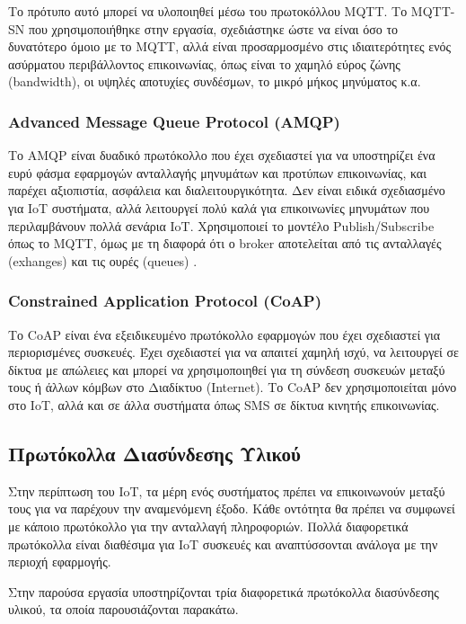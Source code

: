 Το πρότυπο αυτό μπορεί να υλοποιηθεί μέσω του πρωτοκόλλου MQTT. Το MQTT-SN που χρησιμοποιήθηκε στην εργασία, σχεδιάστηκε ώστε να είναι όσο το δυνατότερο όμοιο με το MQTT, αλλά είναι προσαρμοσμένο στις ιδιαιτερότητες ενός ασύρματου περιβάλλοντος επικοινωνίας, όπως είναι το χαμηλό εύρος ζώνης (bandwidth), οι υψηλές αποτυχίες συνδέσμων, το μικρό μήκος μηνύματος κ.α.

\subsubsection{Advanced Message Queue Protocol (AMQP)}
\label{subsubsec:amqp}

Το AMQP είναι δυαδικό πρωτόκολλο που έχει σχεδιαστεί για να υποστηρίζει ένα ευρύ φάσμα εφαρμογών ανταλλαγής μηνυμάτων και προτύπων επικοινωνίας, και παρέχει αξιοπιστία, ασφάλεια και διαλειτουργικότητα. Δεν είναι ειδικά σχεδιασμένο για IoT συστήματα, αλλά λειτουργεί πολύ καλά για επικοινωνίες μηνυμάτων που περιλαμβάνουν πολλά σενάρια IoT. Χρησιμοποιεί το μοντέλο Publish/Subscribe όπως το MQTT, όμως με τη διαφορά ότι ο broker αποτελείται από τις ανταλλαγές (exhanges) και τις ουρές (queues) \cite{bib:naik_2017}.

\subsubsection{Constrained Application Protocol (CoAP)}
\label{subsubsec:coap}

Το CoAP είναι ένα εξειδικευμένο πρωτόκολλο εφαρμογών που έχει σχεδιαστεί για περιορισμένες συσκευές. Έχει σχεδιαστεί για να απαιτεί χαμηλή ισχύ, να λειτουργεί σε δίκτυα με απώλειες και μπορεί να χρησιμοποιηθεί για τη σύνδεση συσκευών μεταξύ τους ή άλλων κόμβων στο Διαδίκτυο (Internet). Το CoAP δεν χρησιμοποιείται μόνο στο IoT, αλλά και σε άλλα συστήματα όπως SMS σε δίκτυα κινητής επικοινωνίας. 

\subsection{Πρωτόκολλα Διασύνδεσης Υλικού}
\label{subsec:hw_protocols}

Στην περίπτωση του IoT, τα μέρη ενός συστήματος πρέπει να επικοινωνούν μεταξύ τους για να παρέχουν την αναμενόμενη έξοδο. Κάθε οντότητα θα πρέπει να συμφωνεί με κάποιο πρωτόκολλο για την ανταλλαγή πληροφοριών. Πολλά διαφορετικά πρωτόκολλα είναι διαθέσιμα για IoT συσκευές και αναπτύσσονται ανάλογα με την περιοχή εφαρμογής.

Στην παρούσα εργασία υποστηρίζονται τρία διαφορετικά πρωτόκολλα διασύνδεσης υλικού, τα οποία παρουσιάζονται παρακάτω.

